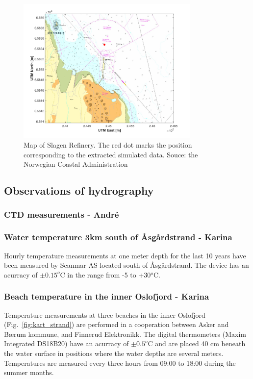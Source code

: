 \documentclass[12pt,a4paper,english]{article}
\begin{document}
\begin{figure}[ht]
\centerline{
\includegraphics*[trim=1cm 0cm 1cm 0cm,clip=true,width=0.8\textwidth]{Figurer/Slagen_kart}}
\caption{\small
Map of Slagen Refinery. The red dot marks the position corresponding to the extracted simulated data. Souce: the Norwegian Coastal Administration}
\label{fig:Slagen-kart}
\end{figure}

\subsection{Observations of hydrography}

\subsubsection{CTD measurements - Andr\'{e}}

\subsubsection{Water temperature 3km south of \AA sg\aa rdstrand - Karina}

Hourly temperature measurements at one meter depth for the last 10 years have been measured by Scanmar AS located south of \AA sg\aa rdstrand. The device has an acurracy of $\pm 0.15^o$C in the range from -5 to +30$^o$C. 

\subsubsection{Beach temperature in the inner Oslofjord - Karina}

Temperature measurements at three beaches in the inner Oslofjord (Fig.~\ref{fig:kart_strand}) are performed in a cooperation between Asker and B\ae rum kommune, and Finnerud Elektronikk.  The digital thermometers (Maxim Integrated DS18B20) have an acurracy of $\pm 0.5^o$C and are placed 40 cm beneath the water surface in positions where the water depths are several meters. Temperatures are measured every three hours from 09:00 to 18:00 during the summer months. 
\end{document}
